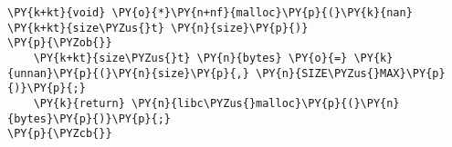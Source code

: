 \begin{Verbatim}[commandchars=\\\{\},codes={\catcode`\$=3\catcode`\^=7\catcode`\_=8}]
\PY{k+kt}{void} \PY{o}{*}\PY{n+nf}{malloc}\PY{p}{(}\PY{k}{nan} \PY{k+kt}{size\PYZus{}t} \PY{n}{size}\PY{p}{)}
\PY{p}{\PYZob{}}
    \PY{k+kt}{size\PYZus{}t} \PY{n}{bytes} \PY{o}{=} \PY{k}{unnan}\PY{p}{(}\PY{n}{size}\PY{p}{,} \PY{n}{SIZE\PYZus{}MAX}\PY{p}{)}\PY{p}{;}
    \PY{k}{return} \PY{n}{libc\PYZus{}malloc}\PY{p}{(}\PY{n}{bytes}\PY{p}{)}\PY{p}{;}
\PY{p}{\PYZcb{}}
\end{Verbatim}

